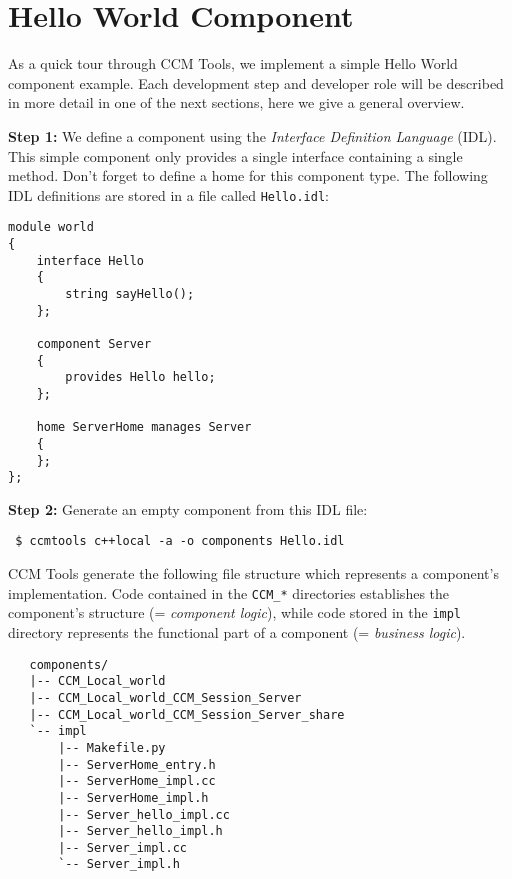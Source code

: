 \section{Hello World Component}
\label{HelloWorldComponent}

As a quick tour through CCM Tools, we implement a simple Hello World 
component example. Each development step and developer role will be described 
in more detail in one of the next sections, here we give a general overview.

\vspace{3mm}
\noindent
{\bf Step 1:} We define a component using the 
{\it Interface Definition Language} (IDL). 
This simple component only provides a single interface containing a single
method. Don't forget to define a home for this component type.
The following IDL definitions are stored in
a file called {\tt Hello.idl}:
\begin{small}
\begin{verbatim}
module world
{ 
    interface Hello 
    { 
        string sayHello(); 
    }; 

    component Server 
    { 
        provides Hello hello;
    }; 

    home ServerHome manages Server
    {
    };
};
\end{verbatim}
\end{small}

\noindent
{\bf Step 2:} Generate an empty component from this IDL file:
\begin{small}
\begin{verbatim}
 $ ccmtools c++local -a -o components Hello.idl
\end{verbatim}
\end{small}

\noindent
CCM Tools generate the following file structure which represents a
component's implementation.
Code contained in the {\tt CCM\_*} directories establishes the component's
structure (= {\it component logic}), while code stored in the {\tt impl}
directory represents the functional part of a component (= {\it business
logic}).

\begin{small}
\begin{verbatim}
   components/
   |-- CCM_Local_world
   |-- CCM_Local_world_CCM_Session_Server
   |-- CCM_Local_world_CCM_Session_Server_share
   `-- impl
       |-- Makefile.py
       |-- ServerHome_entry.h
       |-- ServerHome_impl.cc
       |-- ServerHome_impl.h
       |-- Server_hello_impl.cc
       |-- Server_hello_impl.h
       |-- Server_impl.cc
       `-- Server_impl.h
\end{verbatim}
\end{small}

